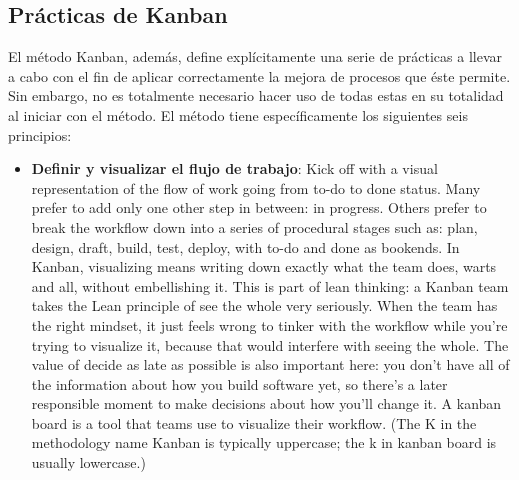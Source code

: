 \subsection{Prácticas de Kanban}

El método Kanban, además, define explícitamente una serie de prácticas a llevar
a cabo con el fin de aplicar correctamente la mejora de procesos que éste
permite. Sin embargo, no es totalmente necesario hacer uso de todas estas en su
totalidad al iniciar con el método. El método tiene específicamente los
siguientes seis principios:

\begin{itemize}
    \item \textbf{Definir y visualizar el flujo de trabajo}: %
    Kick off with a visual representation of the flow of work going from to-do to
    done status. Many prefer to add only one other step in between: in progress.
    Others prefer to break the workflow down into a series of procedural stages such
    as: plan, design, draft, build, test, deploy, with to-do and done as bookends.
    In Kanban, visualizing means writing down exactly what the team does, warts and
    all, without embellishing it. This is part of lean thinking: a Kanban team takes
    the Lean principle of see the whole very seriously. When the team has the right
    mindset, it just feels wrong to tinker with the workflow while you're trying to
    visualize it, because that would interfere with seeing the whole. The value of
    decide as late as possible is also important here: you don't have all of the
    information about how you build software yet, so there's a later responsible
    moment to make decisions about how you'll change it. A kanban board is a tool
    that teams use to visualize their workflow. (The K in the methodology name
    Kanban is typically uppercase; the k in kanban board is usually lowercase.)


\end{itemize}
